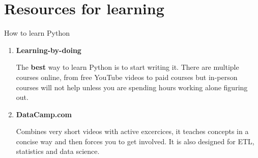 \documentclass[aspectratio=169]{beamer}
\begin{document}
\section{Resources for learning}

\begin{frame}{How to learn Python}

\begin{enumerate}

\item \textbf{Learning-by-doing}

		The \textbf{best} way to learn Python is to start writing it. There are multiple courses online, from free YouTube videos to paid courses but in-person courses will not help unless you are spending hours working alone figuring out.
		
\item \textbf{DataCamp.com}
	
		Combines very short videos with active excercices, it teaches concepts in a concise way and then forces you to get involved. It is also designed for ETL, statistics and data science. 

	
\end{enumerate}
\end{frame}
\end{document}
